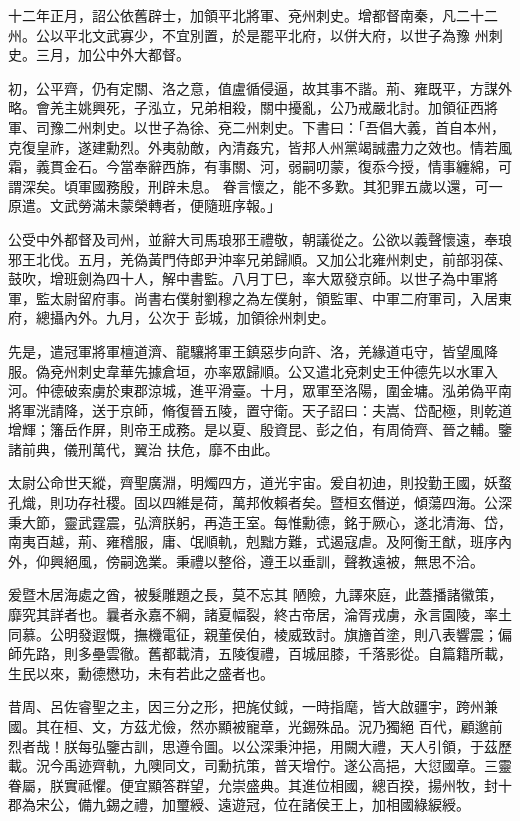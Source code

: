 \begin{pinyinscope}
 十二年正月，詔公依舊辟士，加領平北將軍、兗州刺史。增都督南秦，凡二十二州。公以平北文武寡少，不宜別置，於是罷平北府，以併大府，以世子為豫
 州刺史。三月，加公中外大都督。



 初，公平齊，仍有定關、洛之意，值盧循侵逼，故其事不諧。荊、雍既平，方謀外略。會羌主姚興死，子泓立，兄弟相殺，關中擾亂，公乃戒嚴北討。加領征西將軍、司豫二州刺史。以世子為徐、兗二州刺史。下書曰：「吾倡大義，首自本州，克復皇祚，遂建勳烈。外夷勍敵，內清姦宄，皆邦人州黨竭誠盡力之效也。情若風霜，義貫金石。今當奉辭西旆，有事關、河，弱嗣叨蒙，復忝今授，情事纏綿，可謂深矣。頃軍國務殷，刑辟未息。
 眷言懷之，能不多歎。其犯罪五歲以還，可一原遣。文武勞滿未蒙榮轉者，便隨班序報。」



 公受中外都督及司州，並辭大司馬琅邪王禮敬，朝議從之。公欲以義聲懷遠，奉琅邪王北伐。五月，羌偽黃門侍郎尹沖率兄弟歸順。又加公北雍州刺史，前部羽葆、鼓吹，增班劍為四十人，解中書監。八月丁巳，率大眾發京師。以世子為中軍將軍，監太尉留府事。尚書右僕射劉穆之為左僕射，領監軍、中軍二府軍司，入居東府，總攝內外。九月，公次于
 彭城，加領徐州刺史。



 先是，遣冠軍將軍檀道濟、龍驤將軍王鎮惡步向許、洛，羌緣道屯守，皆望風降服。偽兗州刺史韋華先據倉垣，亦率眾歸順。公又遣北兗刺史王仲德先以水軍入河。仲德破索虜於東郡涼城，進平滑臺。十月，眾軍至洛陽，圍金墉。泓弟偽平南將軍洸請降，送于京師，脩復晉五陵，置守衛。天子詔曰：夫嵩、岱配極，則乾道增輝；籓岳作屏，則帝王成務。是以夏、殷資昆、彭之伯，有周倚齊、晉之輔。鑒諸前典，儀刑萬代，翼治
 扶危，靡不由此。



 太尉公命世天縱，齊聖廣淵，明燭四方，道光宇宙。爰自初迪，則投勤王國，妖蝥孔熾，則功存社稷。固以四維是荷，萬邦攸賴者矣。暨桓玄僭逆，傾蕩四海。公深秉大節，靈武霆震，弘濟朕躬，再造王室。每惟勳德，銘于厥心，遂北清海、岱，南夷百越，荊、雍稽服，庸、氓順軌，剋黜方難，式遏寇虐。及阿衡王猷，班序內外，仰興絕風，傍嗣逸業。秉禮以整俗，遵王以垂訓，聲教遠被，無思不洽。



 爰暨木居海處之酋，被髮雕題之長，莫不忘其
 陋險，九譯來庭，此蓋播諸徽策，靡究其詳者也。曩者永嘉不綱，諸夏幅裂，終古帝居，淪胥戎虜，永言園陵，率土同慕。公明發遐慨，撫機電征，親董侯伯，棱威致討。旗旝首塗，則八表響震；偏師先路，則多壘雲徹。舊都載清，五陵復禮，百城屈膝，千落影從。自篇籍所載，生民以來，勳德懋功，未有若此之盛者也。



 昔周、呂佐睿聖之主，因三分之形，把旄仗鉞，一時指麾，皆大啟疆宇，跨州兼國。其在桓、文，方茲尤儉，然亦顯被寵章，光錫殊品。況乃獨絕
 百代，顧邈前烈者哉！朕每弘鑒古訓，思遵令圖。以公深秉沖挹，用闕大禮，天人引領，于茲歷載。況今禹迹齊軌，九隩同文，司勳抗策，普天增佇。遂公高挹，大愆國章。三靈眷屬，朕實祗懼。便宜顯答群望，允崇盛典。其進位相國，總百揆，揚州牧，封十郡為宋公，備九錫之禮，加璽綬、遠遊冠，位在諸侯王上，加相國綠綟綬。




\end{pinyinscope}
